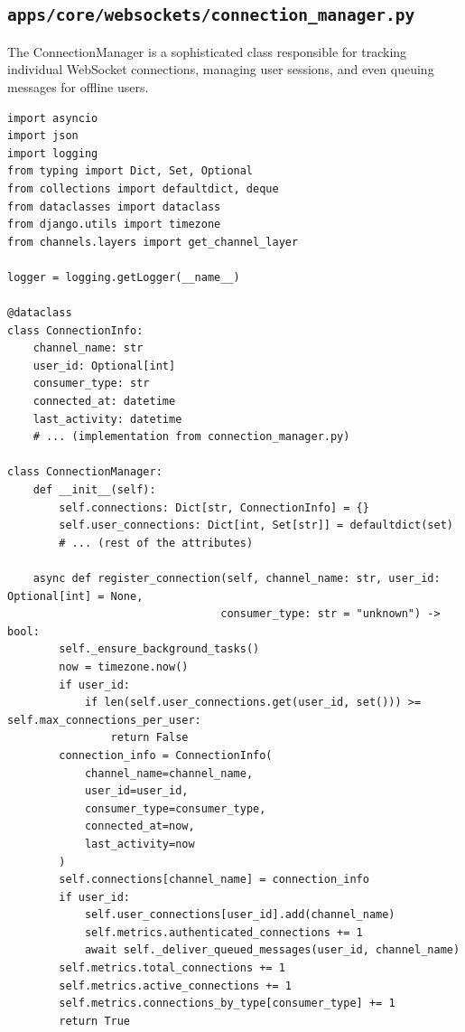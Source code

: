 \documentclass[12pt]{article}
\begin{document}
\subsection{\texttt{apps/core/websockets/connection\_manager.py}}

The ConnectionManager is a sophisticated class responsible for tracking individual WebSocket connections, managing user sessions, and even queuing messages for offline users.

\begin{verbatim}
import asyncio
import json
import logging
from typing import Dict, Set, Optional
from collections import defaultdict, deque
from dataclasses import dataclass
from django.utils import timezone
from channels.layers import get_channel_layer

logger = logging.getLogger(__name__)

@dataclass
class ConnectionInfo:
    channel_name: str
    user_id: Optional[int]
    consumer_type: str
    connected_at: datetime
    last_activity: datetime
    # ... (implementation from connection_manager.py)

class ConnectionManager:
    def __init__(self):
        self.connections: Dict[str, ConnectionInfo] = {}
        self.user_connections: Dict[int, Set[str]] = defaultdict(set)
        # ... (rest of the attributes)

    async def register_connection(self, channel_name: str, user_id: Optional[int] = None,
                                 consumer_type: str = "unknown") -> bool:
        self._ensure_background_tasks()
        now = timezone.now()
        if user_id:
            if len(self.user_connections.get(user_id, set())) >= self.max_connections_per_user:
                return False
        connection_info = ConnectionInfo(
            channel_name=channel_name,
            user_id=user_id,
            consumer_type=consumer_type,
            connected_at=now,
            last_activity=now
        )
        self.connections[channel_name] = connection_info
        if user_id:
            self.user_connections[user_id].add(channel_name)
            self.metrics.authenticated_connections += 1
            await self._deliver_queued_messages(user_id, channel_name)
        self.metrics.total_connections += 1
        self.metrics.active_connections += 1
        self.metrics.connections_by_type[consumer_type] += 1
        return True


\end{verbatim}
\end{document}
